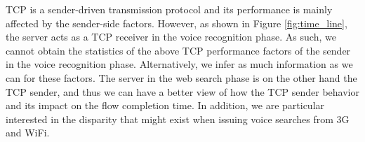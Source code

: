 TCP is a sender-driven transmission protocol and its performance is mainly affected by the sender-side factors. However, as shown in Figure \ref{fig:time_line}, the server acts as a TCP receiver in the voice recognition phase. As such, we cannot obtain the statistics of the above TCP performance factors of the sender in the voice recognition phase. Alternatively, we infer as much information as we can for these factors. The server in the web search phase is on the other hand the TCP sender, and thus we can have a better view of how the TCP sender behavior and its impact on the flow completion time. In addition, we are particular interested in the disparity that might exist when issuing voice searches from 3G and WiFi. 
